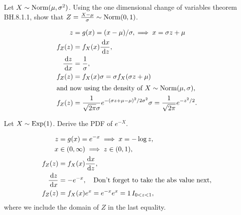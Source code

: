 \begin{exercise}
Let $X \sim \mathrm{Norm}(\mu,\sigma^2)$. Using the one dimensional change of variables theorem  BH.8.1.1, show that $Z = \frac{X-\mu}{\sigma}\sim \mathrm{Norm}(0, 1)$.
\begin{solution}
  \begin{align}
    \label{eq:18}
    z &= g(x) = (x-\mu)/\sigma, \implies x = \sigma z + \mu\\
f_{Z}(z) &= f_{X}(x) \frac{\,\textrm{d}x}{\,\textrm{d}z}, \\
\frac{\,\textrm{d}z}{\,\textrm{d}x } &= \frac{1}{\sigma}, \\
f_{Z}(z) &= f_{X}(x) \sigma = \sigma f_{X}(\sigma z + \mu) \\
\intertext{and now using the density of $X\sim \mathrm{Norm}(\mu, \sigma$),}
f_{Z}(z) &=\frac1{\sqrt{2\pi} \sigma } e^{-(\sigma z + \mu -\mu)^{2}/2\sigma^{2}} \sigma = \frac1{\sqrt{2\pi}} e^{-z^{2}/2}.
  \end{align}
\end{solution}
\end{exercise}

\begin{exercise}
Let $X \sim \mathrm{Exp}(1)$. Derive the PDF of $e^{-X}$.
\begin{solution}
  \begin{align}
z &= g(x) = e^{-x} \implies x = - \log z,\\
x &\in (0, \infty) \implies z \in (0, 1),\\
f_{Z}(z) &= f_{X}(x) \frac{\,\textrm{d}x}{\,\textrm{d}z}, \\
\frac{\,\textrm{d}z}{\,\textrm{d}x } &= - e^{-x}, \quad \text{Don't forget to take the abs value next}, \\
f_{Z}(z) &= f_{X}(x) e^{x} = e^{-x} e^{x} = 1 \,I_{0< z < 1},
  \end{align}
where we include the domain of $Z$ in the last equality.
\end{solution}
\end{exercise}

